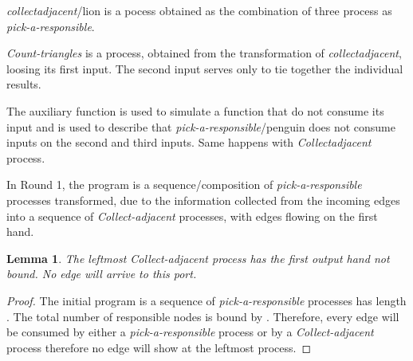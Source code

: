 \documentclass{article}                     \usepackage{graphics}
\newtheorem{lemma}{Lemma}
\begin{document}
     
  
     \textit{collectadjacent}/lion is a pocess obtained as the combination of three process as    \textit{pick-a-responsible}.
     
       
       
  \textit{Count-triangles} is a process, obtained from the transformation of      \textit{collectadjacent}, loosing its first input. The second input serves only to tie together the individual results.
  
         



The auxiliary function  is used to simulate a function that do not consume its input and is used to describe that  \textit{pick-a-responsible}/penguin does not consume inputs on the second and third inputs.  Same happens with \textit{Collectadjacent} process.













In Round 1, the program is a sequence/composition  of  \textit{pick-a-responsible} processes transformed, due to the information collected from the incoming edges   into  a sequence of   \textit{Collect-adjacent} processes, with edges flowing on the first hand. 



\begin{lemma}  The leftmost  \textit{Collect-adjacent} process has the first output hand not bound. No edge will arrive to this port.
\end{lemma} 
\begin{proof}
The initial program is a sequence   of  \textit{pick-a-responsible} processes  has length .  The total number of responsible nodes is bound by  . Therefore, every edge will be consumed by either a \textit{pick-a-responsible} process  or by a \textit{Collect-adjacent} process  therefore no edge will show at the leftmost process. 

\end{proof}
\end{document}
